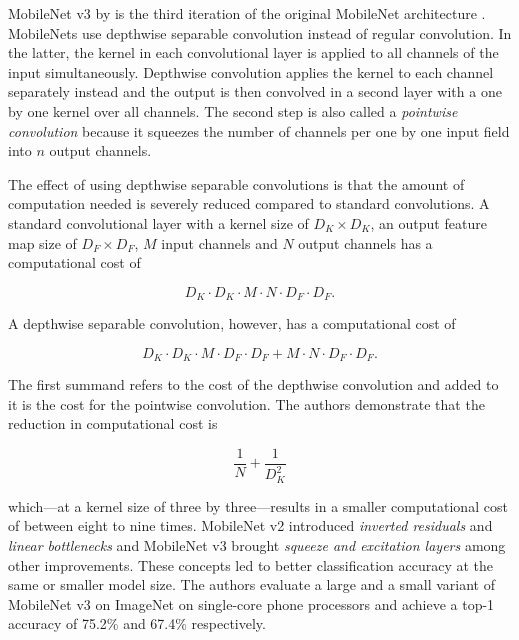\documentclass[draft,final]{vutinfth} %
\begin{document}
MobileNet v3 by \textcite{howard2019} is the third iteration of the
original MobileNet architecture \cite{howard2017}. MobileNets use
depthwise separable convolution instead of regular convolution. In the
latter, the kernel in each convolutional layer is applied to all
channels of the input simultaneously. Depthwise convolution applies
the kernel to each channel separately instead and the output is then
convolved in a second layer with a one by one kernel over all
channels. The second step is also called a \emph{pointwise
convolution} because it squeezes the number of channels per one by one
input field into $n$ output channels.

The effect of using depthwise separable convolutions is that the
amount of computation needed is severely reduced compared to standard
convolutions. A standard convolutional layer with a kernel size of
$D_{K}\times D_{K}$, an output feature map size of $D_{F}\times D_{F}$, $M$
input channels and $N$ output channels has a computational cost of

\begin{equation}
  \label{eq:conv-comp-cost}
  D_{K}\cdot D_{K}\cdot M \cdot N \cdot D_{F}\cdot D_{F}.
\end{equation}

A depthwise separable convolution, however, has a computational cost of

\begin{equation}
  \label{eq:dwsconv-comp-cost}
  D_{K}\cdot D_{K}\cdot M \cdot D_{F}\cdot D_{F} + M \cdot N \cdot D_{F}\cdot D_{F}.
\end{equation}

The first summand refers to the cost of the depthwise convolution and
added to it is the cost for the pointwise convolution. The authors
demonstrate that the reduction in computational cost is

\begin{equation}
  \label{eq:dwsconv-comp-reduction}
  \frac{1}{N} + \frac{1}{D^{2}_{K}}
\end{equation}

which—at a kernel size of three by three—results in a smaller
computational cost of between eight to nine times. MobileNet v2
\cite{sandler2018} introduced \emph{inverted residuals} and
\emph{linear bottlenecks} and MobileNet v3 \cite{howard2019} brought
\emph{squeeze and excitation layers} among other improvements. These
concepts led to better classification accuracy at the same or smaller
model size. The authors evaluate a large and a small variant of
MobileNet v3 on ImageNet on single-core phone processors and achieve a
top-1 accuracy of 75.2\% and 67.4\% respectively.
\end{document}
